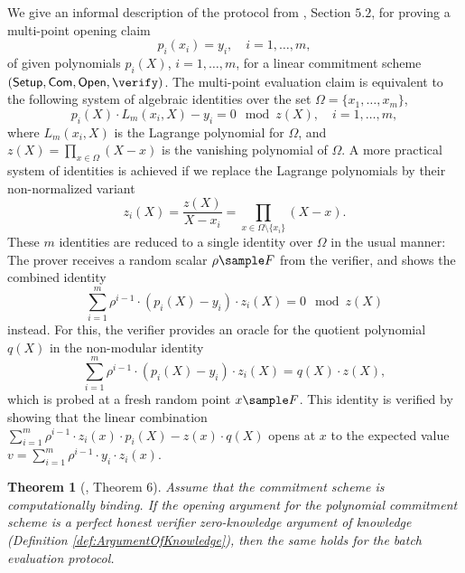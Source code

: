 \documentclass[10pt,article,oneside]{memoir}
\newtheorem{thm}{Theorem}[]
\theoremstyle{definition}
\theoremstyle{remark}
\DeclareMathOperator{\setup}{\mathsf{Setup}}
\DeclareMathOperator{\comm}{\mathsf{Com}}
\DeclareMathOperator{\open}{\mathsf{Open}}
\begin{document}
We give an informal description of the protocol from \cite{HaloInfinite}, Section $5.2$, for proving a multi-point opening claim
\[
p_i(x_i)=y_i, \quad i=1,\ldots,m,
\]
of given polynomials $p_i(X)$, $i=1,\ldots,m$, for a linear commitment scheme $(\setup, \comm, \open,\verify)$.
The multi-point evaluation claim is equivalent to the following system of algebraic identities over the set $\Omega=\{x_1,\ldots, x_m\}$, 
\[
p_i(X)\cdot L_{m}(x_i,X) - y_i = 0 \mod z(X),\quad i=1,\ldots,m,
\]
where $L_{m}(x_i,X)$ is the Lagrange polynomial for $\Omega$, and $z(X)=\prod_{x\in\Omega} (X-x)$ is the vanishing polynomial of $\Omega$.
A more practical system of identities is achieved if we replace the Lagrange polynomials by their non-normalized variant 
\[
z_i(X) = \frac{z(X)}{X-x_i}= \prod_{x\in\Omega\setminus\{x_i\}}(X-x).
\]
These $m$ identities are reduced to a single identity over $\Omega$ in the usual manner:
The prover receives a random scalar $\rho\sample F$ from the verifier, and shows the combined identity
\[
\sum_{i=1}^m \rho^{i-1} \cdot \left( p_i(X) - y_i\right) \cdot z_i(X)
    = 0 \mod z(X)
\]
instead.
For this, the verifier provides an oracle for the quotient polynomial $q(X)$ in the non-modular identity
\[
\sum_{i=1}^m \rho^{i-1} \cdot \left( p_i(X) - y_i\right)\cdot z_i(X) = q(X)\cdot z(X),
\]
which is probed at a fresh random point $x\sample F$.
This identity is verified by showing that the linear combination $\sum_{i=1}^m \rho^{i-1} \cdot z_i(x) \cdot  p_i(X) -  z(x)\cdot q(X)$ opens at $x$ to the expected value $v = \sum_{i=1}^{m} \rho^{i-1}\cdot y_i\cdot z_i(x)$.

\begin{thm}[\cite{HaloInfinite}, Theorem 6]
\label{thm:BatchEvaluation}
Assume that the commitment scheme is computationally binding.
If the opening argument for the polynomial commitment scheme is a perfect honest verifier zero-knowledge argument of knowledge (Definition \ref{def:ArgumentOfKnowledge}), then the same holds for the batch evaluation protocol.
\end{thm}



\end{document}
